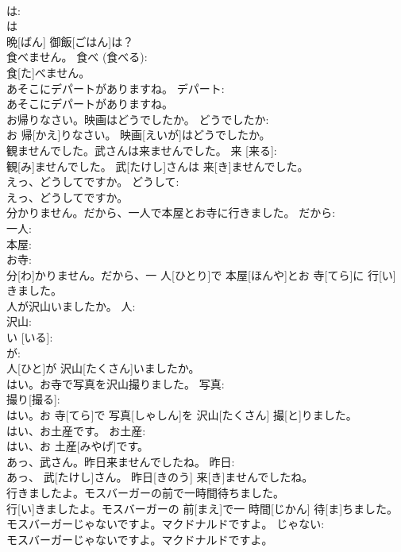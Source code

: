\documentclass[8pt]{extreport}
\begin{document}
\begin{CJK}{UTF8}{min}
\\	は: 
\\	は 
\\	晩[ばん] 御飯[ごはん]は？		
\\	食べません。	食べ (食べる): 
\\	食[た]べません。		
\\	あそこにデパートがありますね。	デパート: 
\\	あそこにデパートがありますね。		
\\	お帰りなさい。映画はどうでしたか。	どうでしたか: 
\\	お 帰[かえ]りなさい。 映画[えいが]はどうでしたか。		
\\	観ませんでした。武さんは来ませんでした。	来 [来る]: 
\\	観[み]ませんでした。 武[たけし]さんは 来[き]ませんでした。		
\\	えっ、どうしてですか。	どうして: 
\\	えっ、どうしてですか。		
\\	分かりません。だから、一人で本屋とお寺に行きました。	だから: 
\\	一人: 
\\	本屋: 
\\	お寺: 
\\	分[わ]かりません。だから、一 人[ひとり]で 本屋[ほんや]とお 寺[てら]に 行[い]きました。		
\\	人が沢山いましたか。	人: 
\\	沢山: 
\\	い [いる]: 
\\	が: 
\\	人[ひと]が 沢山[たくさん]いましたか。		
\\	はい。お寺で写真を沢山撮りました。	写真: 
\\	撮り[撮る]: 
\\	はい。お 寺[てら]で 写真[しゃしん]を 沢山[たくさん] 撮[と]りました。		
\\	はい、お土産です。	お土産: 
\\	はい、お 土産[みやげ]です。		
\\	あっ、武さん。昨日来ませんでしたね。	昨日: 
\\	あっ、 武[たけし]さん。 昨日[きのう] 来[き]ませんでしたね。		
\\	行きましたよ。モスバーガーの前で一時間待ちました。	
\\	行[い]きましたよ。モスバーガーの 前[まえ]で一 時間[じかん] 待[ま]ちました。	
\\	モスバーガーじゃないですよ。マクドナルドですよ。	じゃない: 
\\	モスバーガーじゃないですよ。マクドナルドですよ。		

\end{CJK}
\end{document}
